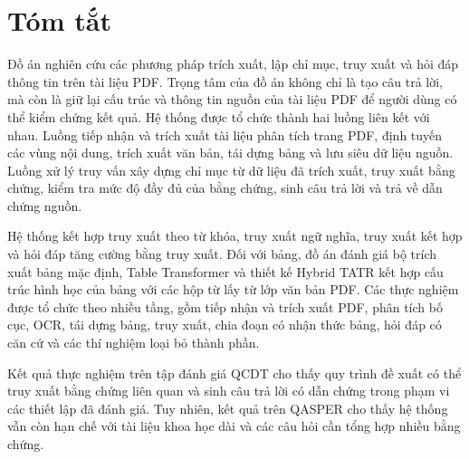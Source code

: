 \documentclass[../DoAn.tex]{subfiles}
\begin{document}
\section*{Tóm tắt}

Đồ án nghiên cứu các phương pháp trích xuất, lập chỉ mục, truy xuất và hỏi đáp
thông tin trên tài liệu PDF. Trọng tâm của đồ án không chỉ là tạo câu trả lời, mà
còn là giữ lại cấu trúc và thông tin nguồn của tài liệu PDF để người dùng có thể
kiểm chứng kết quả. Hệ thống được tổ chức thành hai luồng liên kết với nhau.
Luồng tiếp nhận và trích xuất tài liệu phân tích trang PDF, định tuyến các vùng
nội dung, trích xuất văn bản, tái dựng bảng và lưu siêu dữ liệu nguồn. Luồng xử
lý truy vấn xây dựng chỉ mục từ dữ liệu đã trích xuất, truy xuất bằng chứng, kiểm
tra mức độ đầy đủ của bằng chứng, sinh câu trả lời và trả về dẫn chứng nguồn.

Hệ thống kết hợp truy xuất theo từ khóa, truy xuất ngữ nghĩa, truy xuất kết hợp và
hỏi đáp tăng cường bằng truy xuất. Đối với bảng, đồ án đánh giá bộ trích xuất
bảng mặc định, Table Transformer và thiết kế Hybrid TATR kết hợp cấu trúc hình
học của bảng với các hộp từ lấy từ lớp văn bản PDF. Các thực nghiệm được tổ
chức theo nhiều tầng, gồm tiếp nhận và trích xuất PDF, phân tích bố cục, OCR,
tái dựng bảng, truy xuất, chia đoạn có nhận thức bảng, hỏi đáp có căn cứ và các
thí nghiệm loại bỏ thành phần.

Kết quả thực nghiệm trên tập đánh giá QCDT cho thấy quy trình đề xuất có thể
truy xuất bằng chứng liên quan và sinh câu trả lời có dẫn chứng trong phạm vi
các thiết lập đã đánh giá. Tuy nhiên, kết quả trên QASPER cho thấy hệ thống
vẫn còn hạn chế với tài liệu khoa học dài và các câu hỏi cần tổng hợp nhiều bằng
chứng.
\end{document}
